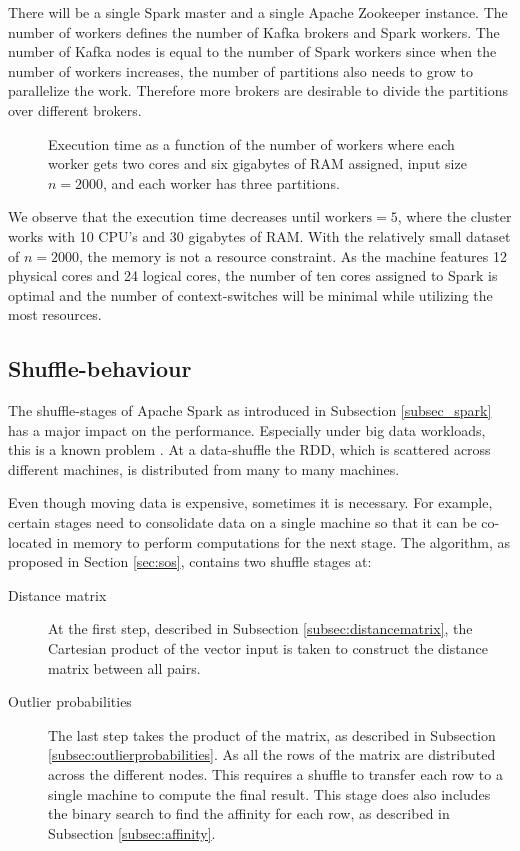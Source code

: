 There will be a single Spark master and a single Apache Zookeeper instance. The number of workers defines the number of Kafka brokers and Spark workers. The number of Kafka nodes is equal to the number of Spark workers since when the number of workers increases, the number of partitions also needs to grow to parallelize the work. Therefore more brokers are desirable to divide the partitions over different brokers.

\begin{figure}[ht!]
    \begin{center}
        
        \caption[Execution time as a function of workers.]{Execution time as a function of the number of workers where each worker gets two cores and six gigabytes of RAM assigned, input size $n=2000$, and each worker has three partitions.}
        \label{fig:parallelization}
    \end{center}
\end{figure}

We observe that the execution time decreases until $\text{workers} = 5$, where the cluster works with 10 CPU's and 30 gigabytes of RAM. With the relatively small dataset of $n=2000$, the memory is not a resource constraint. As the machine features 12 physical cores and 24 logical cores, the number of ten cores assigned to Spark is optimal and the number of context-switches will be minimal while utilizing the most resources.

\subsection{Shuffle-behaviour \label{subsec:shuffle-behaviour}}

The shuffle-stages of Apache Spark as introduced in Subsection \ref{subsec_spark} has a major impact on the performance. Especially under big data workloads, this is a known problem \cite{Chen:2009:UTI:1592681.1592693}. At a data-shuffle the RDD, which is scattered across different machines, is distributed from many to many machines. 

Even though moving data is expensive, sometimes it is necessary. For example, certain stages need to consolidate data on a single machine so that it can be co-located in memory to perform computations for the next stage. The algorithm, as proposed in Section \ref{sec:sos}, contains two shuffle stages at:
\begin{description}
  \item[Distance matrix] At the first step, described in Subsection \ref{subsec:distancematrix}, the Cartesian product of the vector input is taken to construct the distance matrix between all pairs.
  \item[Outlier probabilities] The last step takes the product of the matrix, as described in Subsection \ref{subsec:outlierprobabilities}. As all the rows of the matrix are distributed across the different nodes. This requires a shuffle to transfer each row to a single machine to compute the final result. This stage does also includes the binary search to find the affinity for each row, as described in Subsection \ref{subsec:affinity}.
\end{description}

